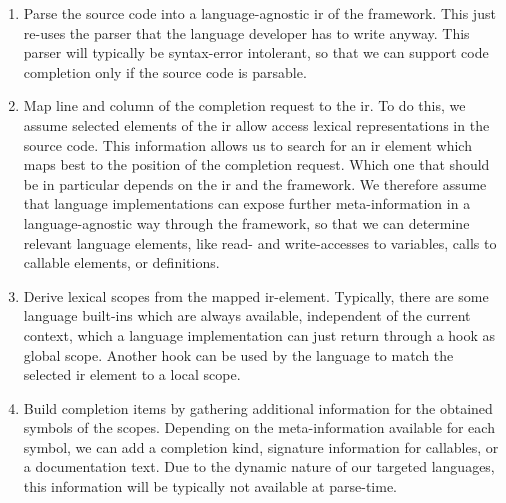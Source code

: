 \documentclass[sigplan,10pt,review,anonymous]{acmart}
\begin{document}
\begin{enumerate}
\item Parse the source code into a language-agnostic \ac{ir} of the
  framework. This just re-uses the parser that the language developer has to
  write anyway. This parser will typically be syntax-error intolerant, so that
  we can support code completion only if the source code is parsable.
\item Map line and column of the completion request to the \ac{ir}. To do this,
  we assume selected elements of the \ac{ir} allow access lexical
  representations in the source code. This information allows us to search for
  an \ac{ir} element which maps best to the position of the completion
  request. Which one that should be in particular depends on the \ac{ir} and the
  framework. We therefore assume that language implementations can expose
  further meta-information in a language-agnostic way through the framework, so
  that we can determine relevant language elements, like read- and
  write-accesses to variables, calls to callable elements, or definitions.
\item Derive lexical scopes from the mapped \ac{ir}-element. Typically, there
  are some language built-ins which are always available, independent of the
  current context, which a language implementation can just return through a
  hook as global scope. Another hook can be used by the language to match the
  selected \ac{ir} element to a local scope.
\item Build completion items by gathering additional information for the
  obtained symbols of the scopes. Depending on the meta-information available
  for each symbol, we can add a completion kind, signature information for
  callables, or a documentation text. Due to the dynamic nature of our targeted
  languages, this information will be typically not available at parse-time.
\end{enumerate}

    
\end{document}
